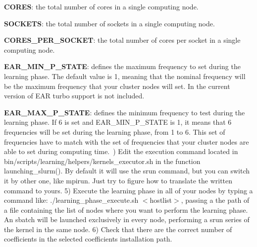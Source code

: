 \begin{DoxyItemize}
\item {\bfseries C\+O\+R\+ES}\+: the total number of cores in a single computing node.~\newline

\item {\bfseries S\+O\+C\+K\+E\+TS}\+: the total number of sockets in a single computing node.~\newline

\item {\bfseries C\+O\+R\+E\+S\+\_\+\+P\+E\+R\+\_\+\+S\+O\+C\+K\+ET}\+: the total number of cores per socket in a single computing node.~\newline

\item {\bfseries E\+A\+R\+\_\+\+M\+I\+N\+\_\+\+P\+\_\+\+S\+T\+A\+TE}\+: defines the maximum frequency to set during the learning phase. The default value is 1, meaning that the nominal frequency will be the maximum frequency that your cluster nodes will set. In the current version of E\+AR turbo support is not included.~\newline

\item {\bfseries E\+A\+R\+\_\+\+M\+A\+X\+\_\+\+P\+\_\+\+S\+T\+A\+TE}\+: defines the minimum frequency to test during the learning phase. If 6 is set and E\+A\+R\+\_\+\+M\+I\+N\+\_\+\+P\+\_\+\+S\+T\+A\+TE is 1, it means that 6 frequencies will be set during the learning phase, from 1 to 6. This set of frequencies have to match with the set of frequencies that your cluster nodes are able to set during computing time.~) Edit the execution command located in {\ttfamily bin/scripts/learning/helpers/kernels\+\_\+executor.\+sh} in the function {\ttfamily launching\+\_\+slurm()}. By default it will use the {\ttfamily srun} command, but you can switch it by other one, like {\ttfamily mpirun}. Just try to figure how to translate the written command to yours. 5) Execute the learning phase in all of your nodes by typing a command like\+: {\ttfamily ./learning\+\_\+phase\+\_\+execute.sh $<$hostlist$>$}, passing a the path of a file containing the list of nodes where you want to perform the learning phase. An {\ttfamily sbatch} will be launched exclusively in every node, performing a {\ttfamily srun} series of the kernel in the same node. 6) Check that there are the correct number of coefficients in the selected coefficients installation path. 
\end{DoxyItemize}